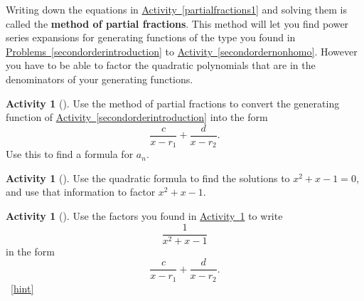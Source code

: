 \documentclass[10pt,]{book}
\newcommand{\terminology}[1]{\textbf{#1}}
\theoremstyle{plain}
\theoremstyle{definition}
\theoremstyle{definition}
\theoremstyle{definition}
\newtheorem{activity}[project]{Activity}
\numberwithin{equation}{chapter}
\begin{document}
\hypertarget{p-1365}{}%
Writing down the equations in \hyperref[partialfractions1]{Activity~\ref{partialfractions1}} and solving them is called the \terminology{method of partial fractions}. This method will let you find power series expansions for generating functions of the type you found in \hyperref[secondorderintroduction]{Problems~\ref{secondorderintroduction}} to \hyperref[secondordernonhomo]{Activity~\ref{secondordernonhomo}}. However you have to be able to factor the quadratic polynomials that are in the denominators of your generating functions.%
\begin{activity}[]\label{activity-259}
\hypertarget{p-1366}{}%
Use the method of partial fractions to convert the generating function of \hyperref[secondorderintroduction]{Activity~\ref{secondorderintroduction}} into the form%
\begin{equation*}
\frac{c}{x-r_1} + \frac{d}{x-r_2}\text{.}
\end{equation*}
Use this to find a formula for \(a_n\).%
\end{activity}
\begin{activity}[]\label{factorFibonacci}
\hypertarget{p-1368}{}%
Use the quadratic formula to find the solutions to \(x^2+x-1=0\), and use that information to factor \(x^2+x-1\).%
\end{activity}
\begin{activity}[]\label{fractionFibonacci}
\hypertarget{p-1370}{}%
Use the factors you found in \hyperref[factorFibonacci]{Activity~\ref{factorFibonacci}} to write%
\begin{equation*}
\frac{1}{x^2+x-1}
\end{equation*}
in the form%
\begin{equation*}
\frac{c}{x-r_1} + \frac{d}{x-r_2}.
\end{equation*}
%
~\hfill{\tiny\hyperlink{a-268}{[hint]}\hypertarget{q-268}{}}\end{activity}
\end{document}
